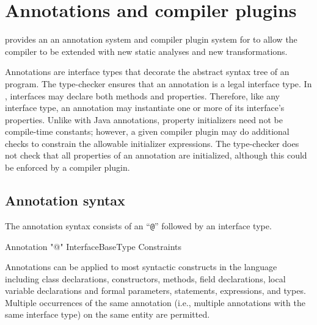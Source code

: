 \chapter{Annotations and compiler plugins}\label{XtenAnnotations}


\Xten{} provides an 
an annotation system and compiler plugin system for to allow the
compiler to be extended with new static analyses and new
transformations.

Annotations are interface types that decorate the abstract syntax tree
of an \Xten{} program.  The \Xten{} type-checker ensures that an annotation
is a legal interface type.
In \Xten{}, interfaces may declare
both methods and properties.  Therefore, like any interface type, an
annotation may instantiate
one or more of its interface's properties.
Unlike with Java
annotations,
property initializers need not be
compile-time constants;
however, a given compiler plugin
may do additional checks to constrain the allowable
initializer expressions.
The \Xten{} type-checker does not check that
all properties of an annotation are initialized,
although this could be enforced by
a compiler plugin.

\section{Annotation syntax}

The annotation syntax consists of an ``\texttt{@}'' followed by an interface type.

\begin{grammar}
Annotation \: \xcd"@" InterfaceBaseType Constraints\opt \\
\end{grammar}

Annotations can be applied to most syntactic constructs in the language
including class declarations, constructors, methods, field declarations,
local variable declarations and formal parameters, statements,
expressions, and types.
Multiple occurrences of the same annotation (i.e., multiple
annotations with the same interface type) on the same entity are permitted.

